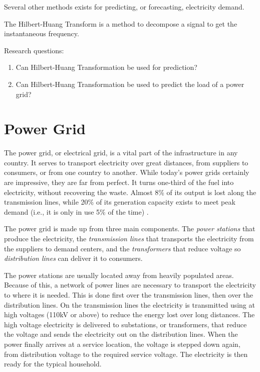 \documentclass[12pt]{article}
\begin{document}
Several other methods exists for predicting, or forecasting, electricity demand. 

The Hilbert-Huang Transform is a method to decompose a signal to get the instantaneous frequency. 



Research questions:
\begin{enumerate}
\item Can Hilbert-Huang Transformation be used for prediction?
\item Can Hilbert-Huang Transformation be used to predict the load of a power grid?
\end{enumerate}

\section{Power Grid}
\label{powerGrid}
The power grid, or electrical grid, is a vital part of the infrastructure in any country. It serves to transport electricity over great distances, from suppliers to consumers, or from one country to another. While today's power grids certainly are impressive, they are far from perfect. It turns one-third of the fuel into electricity, without recovering the waste. Almost 8\% of its output is lost along the transmission lines, while 20\% of its generation capacity exists to meet peak demand (i.e., it is only in use 5\% of the time) \cite{smartgridPath}.

The power grid is made up from three main components. The \textit{power stations} that produce the electricity, the \textit{transmission lines} that transports the electricity from the suppliers to demand centers, and the \textit{transformers} that reduce voltage so \textit{distribution lines} can deliver it to consumers.

The power stations are usually located away from heavily populated areas. Because of this, a network of power lines are necessary to transport the electricity to where it is needed. This is done first over the transmission lines, then over the distribution lines. On the transmission lines the electricity is transmitted using at high voltages (110kV or above) to reduce the energy lost over long distances. The high voltage electricity is delivered to substations, or transformers, that reduce the voltage and sends the electricity out on the distribution lines. When the power finally arrives at a service location, the voltage is stepped down again, from distribution voltage to the required service voltage. The electricity is then ready for the typical household. 
\end{document}
